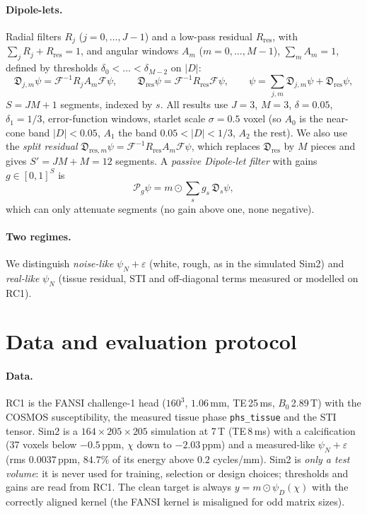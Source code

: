 \documentclass[11pt]{article}
\newcommand{\F}{\mathcal{F}}
\newcommand{\md}{\mathfrak{D}}
\newcommand{\abs}[1]{\lvert #1\rvert}
\newcommand{\code}[1]{\texttt{#1}}
\begin{document}
\paragraph{Dipole-lets.} Radial filters $R_j$ ($j=0,\dots,J-1$) and a low-pass residual $R_{\mathrm{res}}$, with $\sum_jR_j+R_{\mathrm{res}}=1$, and angular windows $A_m$ ($m=0,\dots,M-1$), $\sum_mA_m=1$, defined by thresholds $\delta_0<\dots<\delta_{M-2}$ on $\abs{D}$:
\begin{equation}
\md_{j,m}\psi=\F^{-1}R_jA_m\F\psi,\qquad \md_{\mathrm{res}}\psi=\F^{-1}R_{\mathrm{res}}\F\psi,\qquad \psi=\sum_{j,m}\md_{j,m}\psi+\md_{\mathrm{res}}\psi,
\end{equation}
$S=JM+1$ segments, indexed by $s$. All results use $J=3$, $M=3$, $\delta=0.05$, $\delta_1=1/3$, error-function windows, starlet scale $\sigma=0.5$ voxel (so $A_0$ is the near-cone band $\abs D<0.05$, $A_1$ the band $0.05<\abs D<1/3$, $A_2$ the rest). We also use the \emph{split residual} $\md_{\mathrm{res},m}\psi=\F^{-1}R_{\mathrm{res}}A_m\F\psi$, which replaces $\md_{\mathrm{res}}$ by $M$ pieces and gives $S'=JM+M=12$ segments.
A \emph{passive Dipole-let filter} with gains $g\in[0,1]^S$ is
\begin{equation}\label{eq:passive}
\mathcal P_g\psi=m\odot\sum_{s}g_s\,\md_s\psi,
\end{equation}
which can only attenuate segments (no gain above one, none negative).

\paragraph{Two regimes.} We distinguish \emph{noise-like} $\psi_N+\varepsilon$ (white, rough, as in the simulated Sim2) and \emph{real-like} $\psi_N$ (tissue residual, STI and off-diagonal terms measured or modelled on RC1).

\section{Data and evaluation protocol}\label{sec:protocol}

\paragraph{Data.} RC1 is the FANSI challenge-1 head ($160^3$, $1.06$\,mm, TE\,25\,ms, $B_0$\,2.89\,T) with the COSMOS susceptibility, the measured tissue phase \code{phs\_tissue} and the STI tensor. Sim2 is a $164\times205\times205$ simulation at 7\,T (TE\,8\,ms) with a calcification (37 voxels below $-0.5$\,ppm, $\chi$ down to $-2.03$\,ppm) and a measured-like $\psi_N+\varepsilon$ (rms $0.0037$\,ppm, $84.7\%$ of its energy above $0.2$ cycles/mm). Sim2 is \emph{only a test volume}: it is never used for training, selection or design choices; thresholds and gains are read from RC1.
The clean target is always $y=m\odot\psi_D(\chi)$ with the correctly aligned kernel (the FANSI kernel is misaligned for odd matrix sizes).
\end{document}
